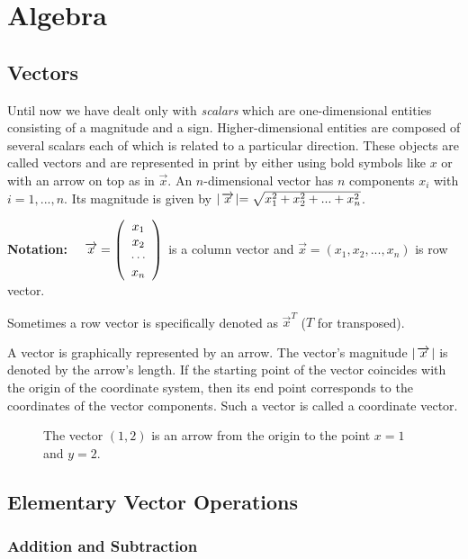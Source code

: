 

\section{Algebra}
\subsection{Vectors}
Until now we have dealt only with  \emph{scalars} which are
one-dimensional entities consisting of a magnitude and a sign.
Higher-dimensional entities are composed of several scalars each
of which is related to a particular direction. These objects are called
vectors and are represented in print by either using bold symbols like
{\boldmath $x$} or with an arrow on top as in $\vec{x}$. An
$n$-dimensional vector has $n$ components $x_i$ with $i=1,...,n$.
Its magnitude is given by $\abs{\vec{x}}=\sqrt{x_1^2+x_2^2+...+x_n^2}$.

{\bf Notation:} $\quad \vec{x}=\left(\ba{c}x_1 \\ x_2 \\ \cdots \\x_n \ea \right)$
is a column vector and $\vec{x} = (x_1, x_2, ..., x_n)$ is row vector.

Sometimes a row vector is specifically denoted as $\vec{x}^T$ ($T$ for transposed).

A vector is graphically represented by an arrow. The vector's magnitude
$\abs{\vec{x}}$ is denoted by the arrow's length. If the starting point of the
vector coincides with the origin of the coordinate system, then
its end point corresponds to the coordinates of the vector components.
Such a vector is called a coordinate vector. \vs

\begin{figure}[!h]
    \centerline{\epsfxsize=10cm  } \svs
    \caption{The vector $(1,2)$ is an arrow from the origin to the point $x=1$ and $y=2$.} \label{fig27}
\end{figure}


\subsection{Elementary Vector Operations}

\subsubsection{Addition and Subtraction}

